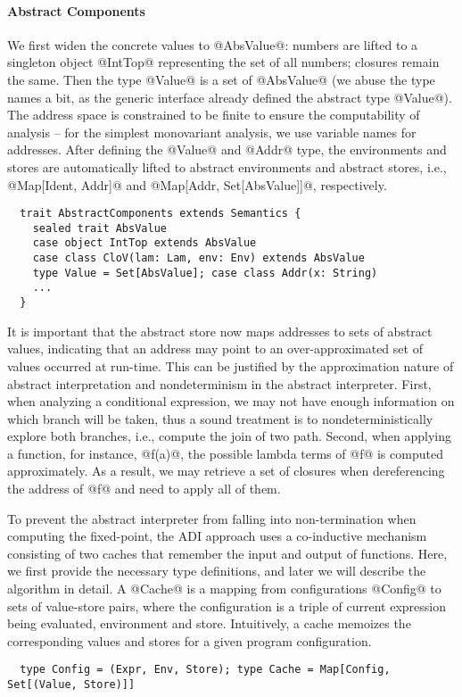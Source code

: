 \paragraph{Abstract Components}

We first widen the concrete values to @AbsValue@: numbers are lifted to a
singleton object @IntTop@ representing the set of all numbers; closures remain
the same. Then the type @Value@ is a set of @AbsValue@ (we abuse the type names
a bit, as the generic interface already defined the abstract type @Value@).
The address space is constrained to be finite to ensure the computability of
analysis -- for the simplest monovariant analysis, we use variable names for
addresses. After defining the @Value@ and @Addr@ type, the environments and
stores are automatically lifted to abstract environments and abstract stores,
i.e., @Map[Ident, Addr]@ and @Map[Addr, Set[AbsValue]]@, respectively.
\begin{lstlisting}
  trait AbstractComponents extends Semantics {
    sealed trait AbsValue
    case object IntTop extends AbsValue
    case class CloV(lam: Lam, env: Env) extends AbsValue
    type Value = Set[AbsValue]; case class Addr(x: String)
    ...
  }
\end{lstlisting}

It is important that the abstract store now maps addresses to sets of abstract
values, indicating that an address may point to an over-approximated set of
values occurred at run-time.  This can be justified by the approximation nature
of abstract interpretation and nondeterminism in the abstract interpreter.
First, when analyzing a conditional expression, we may not have enough
information on which branch will be taken, thus a sound treatment is to
nondeterministically explore both branches, i.e., compute the join of two path.
Second, when applying a function, for instance, @f(a)@, the possible lambda
terms of @f@ is computed approximately. As a result, we may retrieve a set of
closures when dereferencing the address of @f@ and need to apply all of them.

To prevent the abstract interpreter from falling into non-termination when
computing the fixed-point, the ADI approach uses a co-inductive mechanism
consisting of two caches that remember the input and output of functions.
Here, we first provide the necessary type definitions, and later we will describe
the algorithm in detail. A @Cache@ is a mapping from configurations @Config@ to
sets of value-store pairs, where the configuration is a triple of current
expression being evaluated, environment and store. Intuitively, a cache memoizes
the corresponding values and stores for a given program configuration.
\begin{lstlisting}
  type Config = (Expr, Env, Store); type Cache = Map[Config, Set[(Value, Store)]]
\end{lstlisting}

